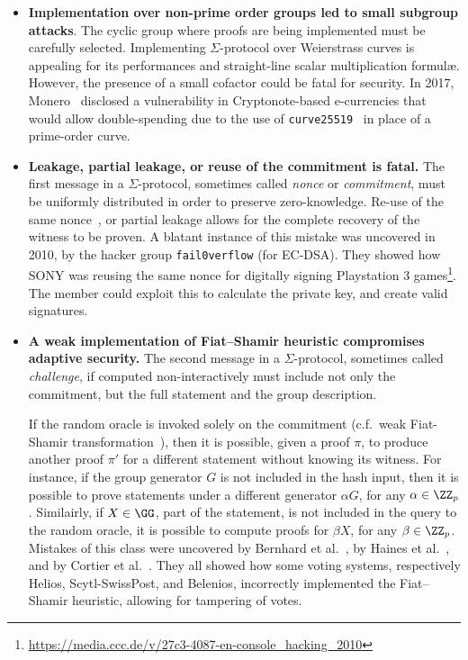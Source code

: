 \documentclass[runningheads]{llncs}
\begin{document}
\begin{itemize}
  \item \textbf{Implementation over non-prime order groups led to small subgroup attacks}. The cyclic group where proofs are being implemented must be carefully selected. Implementing $\Sigma$-protocol over Weierstrass curves is appealing for its performances and straight-line scalar multiplication formul\ae.
   However, the presence of a small cofactor could be fatal for security.
In 2017, Monero~\cite{monero-fail} disclosed a vulnerability in Cryptonote-based e-currencies that would allow double-spending
due to the use of \verb|curve25519|~\cite{PKC:Bernstein06} in place of a prime-order curve.
  \item \textbf{Leakage, partial leakage, or reuse of the commitment is fatal.}
  The first message in a  $\Sigma$-protocol, sometimes called \emph{nonce} or \emph{commitment}, must be uniformly distributed in order to preserve zero-knowledge. Re-use of the same nonce~\cite{CCS:ANTTY20}, or partial leakage allows for the complete recovery of the witness to be proven.
  A blatant instance of this mistake was uncovered in 2010, by the hacker group \texttt{fail0verflow} (for EC-DSA). They showed how SONY was reusing the same nonce for digitally signing Playstation 3 games\footnote{\url{https://media.ccc.de/v/27c3-4087-en-console_hacking_2010}}.  The member could exploit this to calculate the private key, and create valid signatures.

  \item \textbf{A weak implementation of Fiat--Shamir heuristic compromises adaptive security.} The second message in a  $\Sigma$-protocol, sometimes called \emph{challenge}, if computed non-interactively must include not only the commitment, but the full statement and the group description.

  If the random oracle is invoked solely on the commitment (c.f.\ weak Fiat-Shamir transformation~\cite[Def.\ 2]{AC:BerPerWar12}), then it is possible, given a proof $\pi$, to produce another proof $\pi'$ for a different statement without knowing its witness.
  For instance, if the group generator $G$ is not included in the hash input, then it is possible to prove statements under a different generator $\alpha G$, for any $\alpha \in \ZZ_p$.
  Similairly, if $X \in \GG$, part of the statement, is not included in the query to the random oracle, it is possible to compute proofs for $\beta X$, for any $\beta \in \ZZ_p$.
  Mistakes of this class were uncovered by Bernhard et al.~\cite{AC:BerPerWar12}, by Haines et al.~\cite{SP:HLPT20}, and by Cortier et al.~\cite{cortier2020}.
  They all showed how some voting systems, respectively Helios,  Scytl-SwissPost, and Belenios, incorrectly
  implemented the Fiat--Shamir heuristic, allowing for tampering of votes.

\end{itemize}
\end{document}
